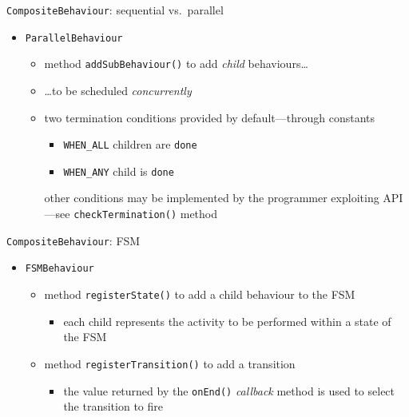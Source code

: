 \documentclass{beamer}\mode<presentation>{\usetheme{AMSCesenaPurpleAndGold}}
\begin{document}
\begin{frame}[c,allowframebreaks]
\begin{block}{\texttt{CompositeBehaviour}: sequential vs.\ parallel}
\begin{itemize}
\begin{itemize}
                \item the whole behaviour ends when the last child ends
            \end{itemize}
            \item \alert{\texttt{ParallelBehaviour}}
            \begin{itemize}
                \item method \texttt{addSubBehaviour()} to add \emph{child} behaviours\ldots
                \item \ldots to be scheduled \emph{concurrently}
                \item two termination conditions provided by default---through constants
                \begin{itemize}
                    \item \texttt{WHEN\_ALL} children are \texttt{done}
                    \item \texttt{WHEN\_ANY} child is \texttt{done}
                \end{itemize}
                other conditions may be implemented by the programmer exploiting \jade{} API---see \texttt{checkTermination()} method
            \end{itemize}
        \end{itemize}
    \end{block}
    \begin{block}{\texttt{CompositeBehaviour}: FSM}
        \begin{itemize}
            \item \alert{\texttt{FSMBehaviour}}
            \begin{itemize}
                \item method \texttt{registerState()} to add a child behaviour to the FSM
                \begin{itemize}
                    \item each child represents the activity to be performed within a state of the FSM
                \end{itemize}
                \item method \texttt{registerTransition()} to add a transition
                \begin{itemize}
                    \item the value returned by the \texttt{onEnd()} \emph{callback} method is used to select the transition to fire

\end{itemize}
\end{itemize}
\end{itemize}
\end{block}
\end{frame}
\end{document}
